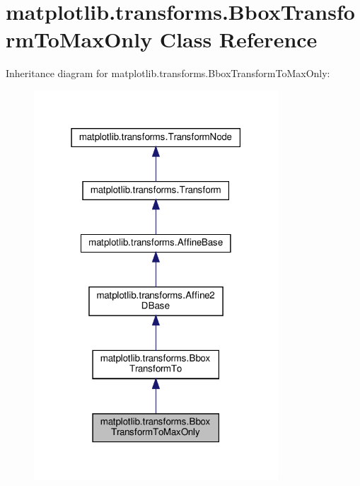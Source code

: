 \hypertarget{classmatplotlib_1_1transforms_1_1BboxTransformToMaxOnly}{}\section{matplotlib.\+transforms.\+Bbox\+Transform\+To\+Max\+Only Class Reference}
\label{classmatplotlib_1_1transforms_1_1BboxTransformToMaxOnly}


Inheritance diagram for matplotlib.\+transforms.\+Bbox\+Transform\+To\+Max\+Only\+:
\nopagebreak
\begin{figure}[H]
\begin{center}
\leavevmode
\includegraphics[width=259pt]{classmatplotlib_1_1transforms_1_1BboxTransformToMaxOnly__inherit__graph}
\end{center}
\end{figure}


